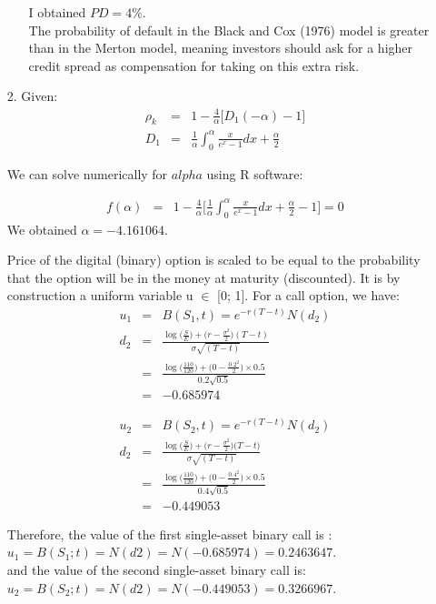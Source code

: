\documentclass[11pt,oneside,a4paper, titlepage]{article}
\begin{document}
\begin{enumerate}
\begin{enumerate}
I obtained \(PD = 4\%\).\\
The probability of default in the Black and Cox (1976) model is greater than in the Merton model, meaning investors should ask for a higher credit spread as compensation for taking on this extra risk.
		
	\end{enumerate}
	
\item[2.] Given:
\begin{eqnarray*}
	\rho_k &=& 1-\frac{4}{\alpha}\big[D_1(-\alpha)-1\big] \\
	D_1 &=& \frac{1}{\alpha} \int_{0}^{\alpha} \frac{x}{e^x-1} dx + \frac{\alpha}{2}
\end{eqnarray*}

We can solve numerically for \(alpha\) using R software:

\begin{eqnarray*}
	f(\alpha) &=& 1-\frac{4}{\alpha} \bigg[\frac{1}{\alpha} \int_{0}^{\alpha} \frac{x}{e^x-1} dx + \frac{\alpha}{2} -1\bigg] = 0
\end{eqnarray*}
We obtained \(\alpha=-4.161064\).

Price of the digital (binary) option is scaled to be equal to the probability that the option
will be in the money at maturity (discounted). It is by construction a uniform variable
u \(\in\) [0; 1]. For a call option, we have:
\begin{eqnarray*}
	u_1 &=& B(S_1,t) = e^{-r(T-t)} N(d_2)\\
	d_2 &=& \frac{\log\big(\frac{S}{E}\big) + \big(r-\frac{\sigma^2}{2}\big)(T-t)}{\sigma \sqrt{(T-t)}} \\
	   &=& \frac{\log\big(\frac{110}{120}\big) + \big(0-\frac{{0.2}^2}{2}\big)\times 0.5}{0.2\sqrt{0.5}} \\
	   &=& -0.685974
\end{eqnarray*}

\begin{eqnarray*}
	u_2 &=& B(S_2,t) = e^{-r(T-t)} N(d_2)\\
	d_2 &=& \frac{\log\big(\frac{S}{E}\big) + \big(r-\frac{\sigma^2}{2})\big(T-t\big)}{\sigma \sqrt{(T-t)}} \\
	&=& \frac{\log\big(\frac{110}{120}\big) + \big(0-\frac{{0.4}^2}{2}\big)\times 0.5}{0.4\sqrt{0.5}} \\
	&=& -0.449053
\end{eqnarray*}

Therefore, the value of the first single-asset binary call is :\\
\(u_1 = B(S_1; t) = N(d2) = N(-0.685974) = 0.2463647\).\\
and the value of the second single-asset binary call is:\\
\(u_2 = B(S_2; t) = N(d2) = N(-0.449053) = 0.3266967\).\\


\end{enumerate}
\end{document}
